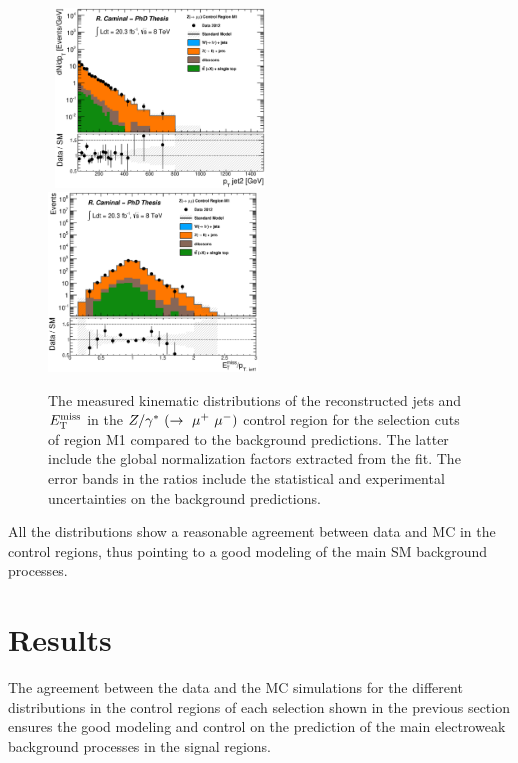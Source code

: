 \begin{figure}[!ht]
\begin{center}
{    }
    \mbox{
      \includegraphics[width=0.495\textwidth]{MonojetAnalysis/Figures/plot_Stop_A6_CRzmm_pt2_fitted.eps}
      \includegraphics[width=0.495\textwidth]{MonojetAnalysis/Figures/plot_Stop_A6_CRzmm_metpt1_fitted.eps}
    }
  \end{center}
  \caption[Kinematic distributions of the reconstructed jets and $\met$ in the $\zmm$ control region for the selection cuts of region M1, after the normalization factors extracted from the fit have been applied.]{The measured kinematic distributions of the reconstructed jets and $\met$ in the $\zmm$ control region for the selection cuts of region M1 compared to the background predictions. The latter include the global normalization factors extracted from the fit. The error bands in the ratios include the statistical and experimental uncertainties on the background predictions.}
  \label{fig:Plot_M1_CRzmm_Jetkinematics}
\end{figure}

All the distributions show a reasonable agreement between data and MC in the control regions, thus pointing to a good modeling of the main SM background processes.


\clearpage
\section{Results}
    \label{sec:ResultsSR}

The agreement between the data and the MC simulations for the different distributions in the control regions of each selection shown in the previous section ensures the good modeling and control on the prediction of the main electroweak background processes in the signal regions.

